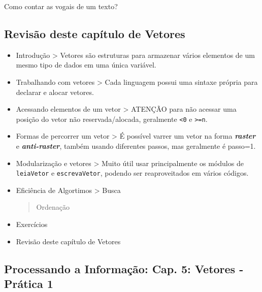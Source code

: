 \documentclass[12pt,a4paper]{article}
\begin{document}
Como contar as vogais de um texto?

    \hypertarget{revisuxe3o-deste-capuxedtulo-de-vetores}{%
\subsection{Revisão deste capítulo de
Vetores}\label{revisuxe3o-deste-capuxedtulo-de-vetores}}

\begin{itemize}
\item
  Introdução \textgreater{} Vetores são estruturas para armazenar vários
  elementos de um mesmo tipo de dados em uma única variável.
\item
  Trabalhando com vetores \textgreater{} Cada linguagem possui uma
  sintaxe própria para declarar e alocar vetores.
\item
  Acessando elementos de um vetor \textgreater{} ATENÇÃO para não
  acessar uma posição do vetor não reservada/alocada, geralmente
  \texttt{\textless{}0} e \texttt{\textgreater{}=n}.
\item
  Formas de percorrer um vetor \textgreater{} É possível varrer um vetor
  na forma \textbf{\emph{raster}} e \textbf{\emph{anti-raster}}, também
  usando diferentes passos, mas geralmente é passo=1.
\item
  Modularização e vetores \textgreater{} Muito útil usar principalmente
  os módulos de \texttt{leiaVetor} e \texttt{escrevaVetor}, podendo ser
  reaproveitados em vários códigos.
\item
  Eficiência de Algortimos \textgreater{} Busca

  \begin{quote}
  Ordenação
  \end{quote}
\item
  Exercícios
\item
  Revisão deste capítulo de Vetores
\end{itemize}

    \hypertarget{processando-a-informauxe7uxe3o-cap.-5-vetores---pruxe1tica-1}{%
\subsection{Processando a Informação: Cap. 5: Vetores - Prática
1}\label{processando-a-informauxe7uxe3o-cap.-5-vetores---pruxe1tica-1}}
\end{document}
